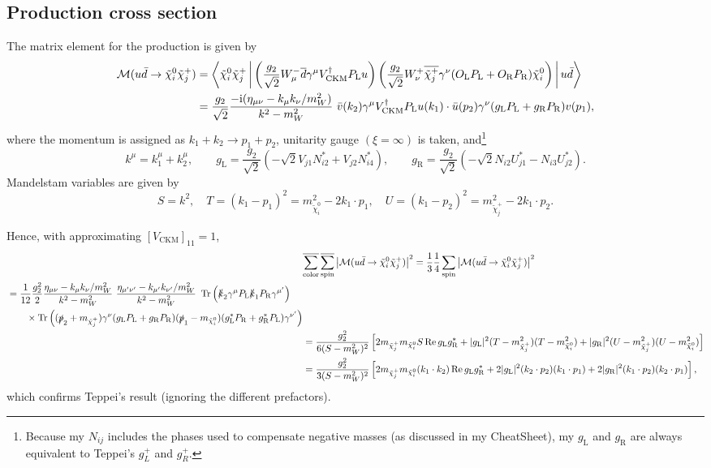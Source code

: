 \documentclass[a4paper,10pt,captions=tableheading,DIV=14]{scrartcl}
\numberwithin{equation}{section}
\newcommand\w[1]{_{\mathrm{#1}}}
\newcommand\ii{\mathrm{i}}
\DeclareMathOperator{\Tr}{\mathrm{Tr}}
\renewcommand{\Re}{\mathop{\mathrm{Re}}}
\newcommand\neut  [1][\relax]{{\tilde\chi^0_{#1}}}
\newcommand\charP [1][\relax]{{\tilde\chi^+_{#1}}}
\newcommand{\gL}{g\w L}
\newcommand{\gR}{g\w R}
\newcommand{\PL}{P\w L}
\newcommand{\PR}{P\w R}
\begin{document}
\subsection{Production cross section}
The matrix element for the production is given by
\begin{align}
 \mathcal M(u\bar d\to\neut[i]\charP[j])
&=
\Braket{\neut[i]\charP[j]|
\left(\frac{g_2}{\sqrt2}W_\mu^- \overline d\gamma^\mu V^\dagger\w{CKM}\PL u\right)
\left(\frac{g_2}{\sqrt2}W_\nu^+ \overline{\charP[j]}\gamma^\nu(O\w L\PL+O\w R\PR)\neut[i]\right)|
u\bar d
}
\\&=
\frac{g_2}{\sqrt2}\frac{-\ii(\eta_{\mu\nu}-k_\mu k_\nu/m_W^2)}{k^2-m_W^2}\
\bar v(k_2) \gamma^\mu V^\dagger\w{CKM}\PL u(k_1)\cdot
\bar u(p_2)\gamma^\nu(\gL\PL+\gR\PR)v(p_1),
\end{align}
where the momentum is assigned as $k_1+k_2\to p_1+p_2$, unitarity gauge $(\xi=\infty)$ is taken, and\footnote{%
  Because my $N_{ij}$ includes the phases used to compensate negative masses (as discussed in my CheatSheet), my $\gL$ and $\gR$ are always equivalent to Teppei's $g_L^+$ and $g_R^+$.
}
\begin{equation}
 k^\mu=k_1^\mu+k_2^\mu,\qquad
 \gL = \frac{g_2}{\sqrt2}\left(-{\sqrt2}V_{j1}N_{i2}^* + V_{j2}N^*_{i4}\right),\qquad
 \gR = \frac{g_2}{\sqrt2}\left(-{\sqrt2}N_{i2}U_{j1}^* - N_{i3}U_{j2}^*\right).
\end{equation}
Mandelstam variables are given by
\begin{equation}
  S= k^2,\quad
  T=(k_1-p_1)^2=m_{\neut[i]}^2-2k_1\cdot p_1,\quad
  U=(k_1-p_2)^2=m_{\charP[j]}^2-2k_1\cdot p_2.
\end{equation}

Hence, with approximating $[V\w{CKM}]_{11}=1$,
\begin{align}
&\overline{\sum\w{color}}\,\overline{\sum\w{spin}}\left|\mathcal M(u\bar d\to\neut[i]\charP[j])\right|^2\notag
=\frac13\frac14\sum\w{spin}\left|\mathcal M(u\bar d\to\neut[i]\charP[j])\right|^2\notag\\
\begin{split}
 &=\frac{1}{12}
 \frac{g_2^2}{2}
 \frac{\eta_{\mu\nu}-k_\mu k_\nu/m_W^2}{k^2-m_W^2}\
 \frac{\eta_{\mu'\nu'}-k_{\mu'}k_{\nu'}/m_W^2}{k^2-m_W^2}\
 \Tr\left(\slashed k_2\gamma^\mu \PL \slashed k_1 \PR\gamma^{\mu'}\right)
 \\&\qquad\times
 \Tr\left(
 (\slashed p_2+m_{\charP[j]})\gamma^\nu(\gL\PL+\gR\PR)(\slashed p_1-m_{\neut[i]})
 (\gL^*\PR + \gR^*\PL)\gamma^{\nu'}
 \right)
\end{split}
\\&=
\frac{g_2^2}{6(S-m_W^2)^2}\left[
2m_{\charP[j]} m_{\neut[i]} S \Re\gL\gR^*+
   |\gL|^2(T-m_{\charP[j]}^2)(T-m_{\neut[i]}^2)+
   |\gR|^2(U-m_{\charP[j]}^2)(U-m_{\neut[i]}^2)
\right]
\\&=
\frac{g_2^2}{3(S-m_W^2)^2}\left[
2m_{\charP[j]} m_{\neut[i]} (k_1\cdot k_2) \Re\gL\gR^*
   +2|\gL|^2(k_2\cdot p_2)(k_1\cdot p_1)
   +2|\gR|^2(k_1\cdot p_2)(k_2\cdot p_1)
\right],
\end{align}
which confirms Teppei's result (ignoring the different prefactors).
\end{document}

